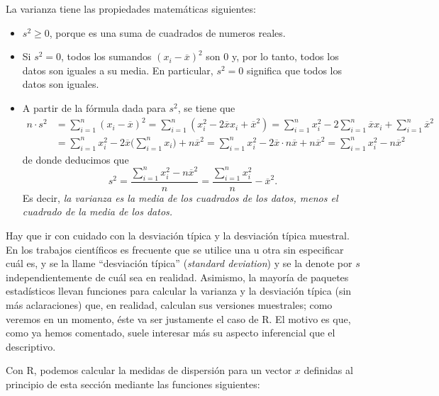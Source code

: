\documentclass[
]{book}
\theoremstyle{definition}
\theoremstyle{definition}
\theoremstyle{definition}
\theoremstyle{remark}
\begin{document}
La varianza tiene las propiedades matemáticas siguientes:

\begin{itemize}
\item
  \(s^2\geqslant 0\), porque es una suma de cuadrados de numeros reales.
\item
  Si \(s^2=0\), todos los sumandos \((x_i-\overline{x})^2\) son 0 y, por lo tanto, todos los datos son iguales a su media. En particular, \(s^2=0\) significa que todos los datos son iguales.
\item
  A partir de la fórmula dada para \(s^2\), se tiene que
  \[
  \begin{array}{rl}
  n\cdot s^2 & \displaystyle = \sum_{i=1}^n (x_i-\overline{x})^2=
  \sum_{i=1}^n (x_i^2-2\overline{x}x_i+\overline{x}^2)=
  \sum_{i=1}^n x_i^2-2\sum_{i=1}^n\overline{x}x_i+\sum_{i=1}^n\overline{x}^2\\[2ex]
  &  \displaystyle =
  \sum_{i=1}^n x_i^2-2\overline{x}\Big(\sum_{i=1}^n x_i\Big)+n\overline{x}^2=
  \sum_{i=1}^n x_i^2-2\overline{x}\cdot n\overline{x}+n\overline{x}^2=
  \sum_{i=1}^n x_i^2-n\overline{x}^2
  \end{array}
  \]
  de donde deducimos que
  \[
  s^2=\frac{\sum_{i=1}^n x_i^2-n\overline{x}^2}{n}=
   \frac{\sum_{i=1}^n x_i^2}{n}-\overline{x}^2.
  \]
  Es decir, \emph{la varianza es la media de los cuadrados de los datos, menos el cuadrado de la media de los datos.}
\end{itemize}

Hay que ir con cuidado con la desviación típica y la desviación típica muestral. En los trabajos científicos es frecuente que se utilice una u otra sin especificar cuál es, y se la llame ``desviación típica'' (\emph{standard deviation}) y se la denote por \(s\) independientemente de cuál sea en realidad. Asimismo, la mayoría de paquetes estadísticos llevan funciones para calcular la varianza y la desviación típica (sin más aclaraciones) que, en realidad, calculan sus versiones muestrales; como veremos en un momento, éste va ser justamente el caso de R. El motivo es que, como ya hemos comentado, suele interesar más su aspecto inferencial que el descriptivo.

Con R, podemos calcular la medidas de dispersión para un vector \(x\) definidas al principio de esta sección mediante las funciones siguientes:
\end{document}

